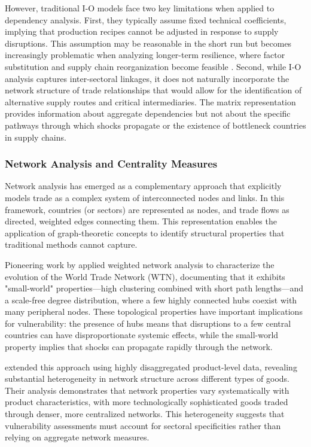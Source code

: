 \documentclass[final,1p,times,authoryear]{elsarticle}
\begin{document}
However, traditional I-O models face two key limitations when applied to dependency analysis. First, they typically assume fixed technical coefficients, implying that production recipes cannot be adjusted in response to supply disruptions. This assumption may be reasonable in the short run but becomes increasingly problematic when analyzing longer-term resilience, where factor substitution and supply chain reorganization become feasible \citep{Arriola2024}. Second, while I-O analysis captures inter-sectoral linkages, it does not naturally incorporate the network structure of trade relationships that would allow for the identification of alternative supply routes and critical intermediaries. The matrix representation provides information about aggregate dependencies but not about the specific pathways through which shocks propagate or the existence of bottleneck countries in supply chains.

\subsubsection{Network Analysis and Centrality Measures}

Network analysis has emerged as a complementary approach that explicitly models trade as a complex system of interconnected nodes and links. In this framework, countries (or sectors) are represented as nodes, and trade flows as directed, weighted edges connecting them. This representation enables the application of graph-theoretic concepts to identify structural properties that traditional methods cannot capture.

Pioneering work by \cite{Fagiolo2010} applied weighted network analysis to characterize the evolution of the World Trade Network (WTN), documenting that it exhibits "small-world" properties—high clustering combined with short path lengths—and a scale-free degree distribution, where a few highly connected hubs coexist with many peripheral nodes. These topological properties have important implications for vulnerability: the presence of hubs means that disruptions to a few central countries can have disproportionate systemic effects, while the small-world property implies that shocks can propagate rapidly through the network.

\cite{DeBenedictis2014} extended this approach using highly disaggregated product-level data, revealing substantial heterogeneity in network structure across different types of goods. Their analysis demonstrates that network properties vary systematically with product characteristics, with more technologically sophisticated goods traded through denser, more centralized networks. This heterogeneity suggests that vulnerability assessments must account for sectoral specificities rather than relying on aggregate network measures.
\end{document}
